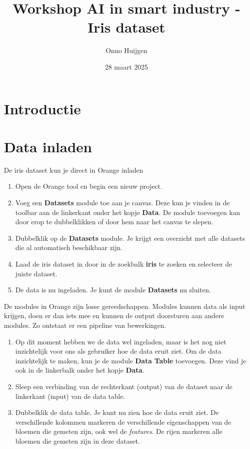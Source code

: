 \documentclass{article}
\title{Workshop AI in smart industry - Iris dataset}
\author{Onno Huijgen}
\date{28 maart 2025}
\newcommand{\tb}[1]{\textbf{#1}}
\begin{document}
\maketitle{}

\section*{Introductie}

\section{Data inladen}
De iris dataset kun je direct in Orange inladen
\begin{enumerate}
\item Open de Orange tool en begin een nieuw project.
\item Voeg een \tb{Datasets} module toe aan je canvas. Deze kun je vinden in de toolbar aan de linkerkant onder het kopje \tb{Data}. De module toevoegen kan door erop te dubbelklikken of door hem naar het canvas te slepen.
\item Dubbelklik op de \tb{Datasets} module. Je krijgt een overzicht met alle datasets die al automatisch beschikbaar zijn.
\item Laad de iris dataset in door in de zoekbalk \tb{iris} te zoeken en selecteer de juiste dataset.
\item De data is nu ingeladen. Je kunt de module \tb{Datasets} nu sluiten.
\end{enumerate}

De modules in Orange zijn losse gereedschappen. Modules kunnen data als input krijgen, doen er dan iets mee en kunnen de output doorsturen aan andere modules. Zo ontstaat er een pipeline van bewerkingen.

\begin{enumerate}[resume]
\item Op dit moment hebben we de data wel ingeladen, maar is het nog niet inzichtelijk voor ons als gebruiker hoe de data eruit ziet. Om de data inzichtelijk te maken, kun je de module \tb{Data Table} toevoegen. Deze vind je ook in de linkerbalk onder het kopje \tb{Data}.
\item Sleep een verbinding van de rechterkant (output) van de dataset naar de linkerkant (input) van de data table.
\item Dubbelklik de data table. Je kunt nu zien hoe de data eruit ziet. De verschillende kolommen markeren de verschillende eigenschappen van de bloemen die gemeten zijn, ook wel de \textit{features}. De rijen markeren alle bloemen die gemeten zijn in deze dataset.
\end{enumerate}
\end{document}
